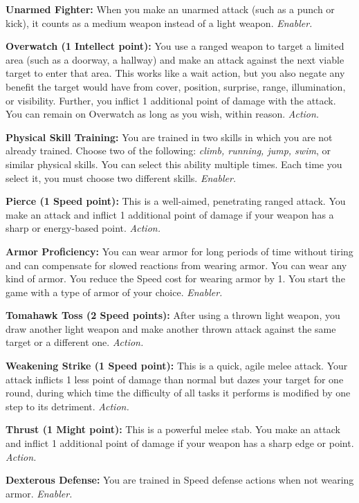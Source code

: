 \documentclass[a4paper,10pt,final,twocolumn,oneside]{book}
\newcommand{\itemAbility}[2]{\textcolor{25gray}{\textbullet\textbf{ #1:}}{ #2}\par}
\newcommand{\enabler}{\textit{ Enabler.}}
\newcommand{\action}{\textit{ Action.}}
\begin{document}
\itemAbility{Unarmed Fighter}{When you make an unarmed attack (such as a punch or kick), it counts as a medium weapon instead of a light weapon.\enabler}

\itemAbility{Overwatch (1 Intellect point)}{You use a ranged weapon to target a limited area (such as a doorway, a hallway) and make an attack against the next viable target to enter that area. This works like a wait action, but you also negate any benefit the target would have from cover, position, surprise, range, illumination, or visibility. Further, you inflict 1 additional point of damage with the attack. You can remain on Overwatch as long as you wish, within reason.\action}

\itemAbility{Physical Skill Training}{You are trained in two skills in which you are not already trained. Choose two of the following: \textit{climb, running, jump, swim}, or similar physical skills. You can select this ability multiple times. Each time you select it, you must choose two different skills.\enabler}

\itemAbility{Pierce (1 Speed point)}{This is a well-aimed, penetrating ranged attack. You make an attack and inflict 1 additional point of damage if your weapon has a sharp or energy-based point.\action}

\itemAbility{Armor Proficiency}{You can wear armor for long periods of time without tiring and can compensate for slowed reactions from wearing armor. You can wear any kind of armor. You reduce the Speed cost for wearing armor by 1. You start the game with a type of armor of your choice.\enabler}

\itemAbility{Tomahawk Toss (2 Speed points)}{After using a thrown light weapon, you draw another light weapon and make another thrown attack against the same target or a different one.\action}

\itemAbility{Weakening Strike (1 Speed point)}{This is a quick, agile melee attack. Your attack inflicts 1 less point of damage than normal but dazes your target for one round, during which time the difficulty of all tasks it performs is modified by one step to its detriment.\action}

\itemAbility{Thrust (1 Might point)}{This is a powerful melee stab. You make an attack and inflict 1 additional point of damage if your weapon has a sharp edge or point.\action}

\itemAbility{Dexterous Defense}{You are trained in Speed defense actions when not wearing armor.\enabler}

\end{document}
